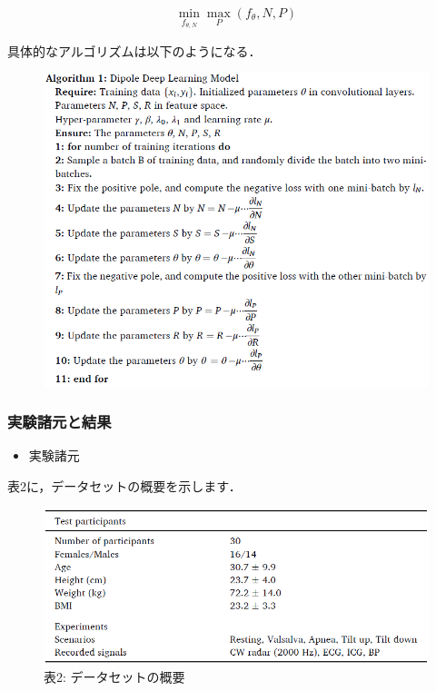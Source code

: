 \documentclass[dvipdfmx]{jsarticle}
\begin{document}
\begin{itemize}
\begin{equation}\label{}
\underset{f_{\theta,N}}{\min} \underset{P}{\max} (f_{\theta}, N, P)
\end{equation}

具体的なアルゴリズムは以下のようになる．
\begin{figure}[H]
\begin{center}
\includegraphics[width=0.8\linewidth]{./img/ddlm_procedure.png}
\end{center}
\end{figure}
\end{itemize}

\subsubsection{実験諸元と結果}
\begin{itemize}
    \item 実験諸元
\end{itemize}
表2に，データセットの概要を示します．

\begin{figure}[H]
\caption*{表2: データセットの概要}
\begin{center}
\includegraphics[width=0.7\linewidth]{./img/ddlm_dataset.png}
\end{center}
\end{figure}
\end{document}
